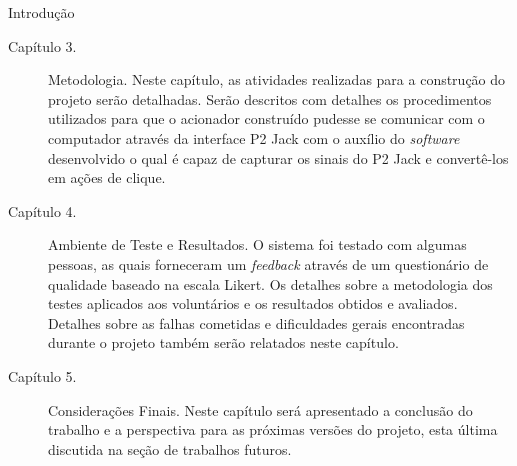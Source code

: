 \begin{chapter}{Introdução}
\begin{description}
	\item[Capítulo 3.] Metodologia. 
	Neste capítulo, as atividades realizadas para a construção do projeto serão
	detalhadas. Serão descritos com detalhes os procedimentos utilizados
	para que o acionador construído pudesse se comunicar com o computador
	através da interface P2 Jack com o auxílio do \textit{software} desenvolvido
	o qual é capaz de capturar os sinais do P2 Jack e convertê-los em ações de
	clique.
	
	\item[Capítulo 4.] Ambiente de Teste e Resultados. 
	O sistema foi testado com algumas pessoas, as quais forneceram um
	\textit{feedback} através de um questionário de qualidade baseado na escala
	Likert.  Os detalhes sobre a metodologia dos testes aplicados aos voluntários e
	os resultados obtidos e avaliados. Detalhes sobre as falhas cometidas e
	dificuldades gerais encontradas durante o projeto também serão relatados neste
	capítulo.

	\item[Capítulo 5.] Considerações Finais. 
    Neste capítulo será apresentado a conclusão do trabalho e a
	perspectiva para as próximas versões do projeto, esta última discutida na
	seção de trabalhos futuros. %
\end{description}

\end{chapter}
